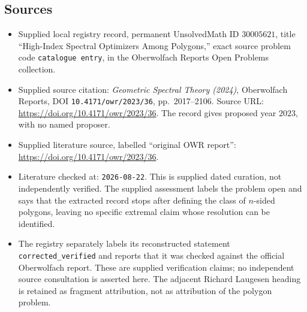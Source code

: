 \documentclass[11pt]{article}
\begin{document}
\subsection{Sources}
\begin{itemize}
\item Supplied local registry record, permanent UnsolvedMath ID \(30005621\), title ``High-Index Spectral Optimizers Among Polygons,'' exact source problem code \texttt{catalogue entry}, in the Oberwolfach Reports Open Problems collection.
\item Supplied source citation: \emph{Geometric Spectral Theory (2024)}, Oberwolfach Reports, DOI \texttt{10.4171/owr/2023/36}, pp.\ 2017--2106. Source URL: \url{https://doi.org/10.4171/owr/2023/36}. The record gives proposed year \(2023\), with no named proposer.
\item Supplied literature source, labelled ``original OWR report'': \url{https://doi.org/10.4171/owr/2023/36}.
\item Literature checked at: \texttt{2026-08-22}. This is supplied dated curation, not independently verified. The supplied assessment labels the problem open and says that the extracted record stops after defining the class of \(n\)-sided polygons, leaving no specific extremal claim whose resolution can be identified.
\item The registry separately labels its reconstructed statement \texttt{corrected\_verified} and reports that it was checked against the official Oberwolfach report. These are supplied verification claims; no independent source consultation is asserted here. The adjacent Richard Laugesen heading is retained as fragment attribution, not as attribution of the polygon problem.
\end{itemize}
\end{document}
